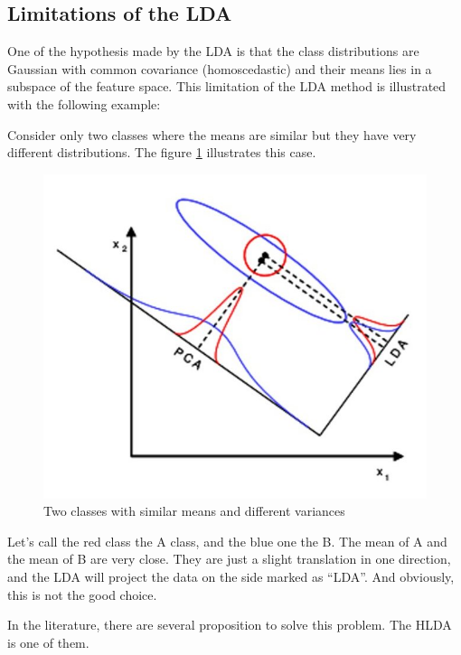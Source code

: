 \subsection{Limitations of the LDA}
\label{sec:limitations-lda}

One of the hypothesis made by the LDA is that the class distributions
are Gaussian with common covariance (homoscedastic) and their means
lies in a subspace of the feature space. This limitation of the LDA
method is illustrated with the following example:

Consider only two classes where the means are similar but they have very
different distributions. The figure \ref{fig:lda-fail} illustrates this case.

\begin{figure}[h]
  \centering
  \includegraphics[scale=0.5]{img/limitation_lda}
  \caption{Two classes with similar means and different variances}
  \label{fig:lda-fail}
\end{figure}

Let's call the red class the A class, and the blue one the B. The mean
of A and the mean of B are very close. They are just a slight
translation in one direction, and the LDA will project the data on the
side marked as ``LDA''. And obviously, this is not the good choice.

In the literature, there are several proposition to solve this problem.
The HLDA is one of them.
